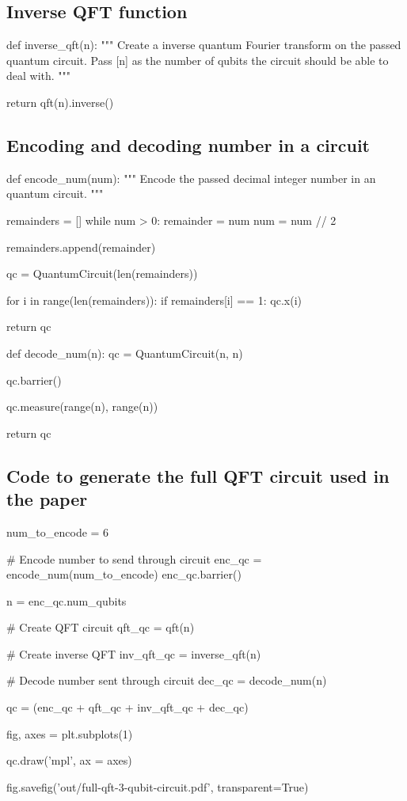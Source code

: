 \subsection{Inverse QFT function}
\label{subsec:inverse-qft-function}

\begin{python}
def inverse_qft(n):
    """
    Create a inverse quantum Fourier transform on the passed quantum circuit.
    Pass [n] as the number of qubits the circuit should be able to deal with.
    """

    return qft(n).inverse()
\end{python}

\subsection{Encoding and decoding number in a circuit}
\label{subsec:encoding-decoding-number-in-circuit}

\begin{python}
def encode_num(num):
    """
    Encode the passed decimal integer number in an quantum circuit.
    """

    remainders = []
    while num > 0:
        remainder = num %
        num = num // 2

        remainders.append(remainder)

    qc = QuantumCircuit(len(remainders))

    for i in range(len(remainders)):
        if remainders[i] == 1:
            qc.x(i)

    return qc


def decode_num(n):
    qc = QuantumCircuit(n, n)

    qc.barrier()

    qc.measure(range(n), range(n))

    return qc
\end{python}

\subsection{Code to generate the full QFT circuit used in the paper}
\label{subsec:generating-full-qft-circuit}

\begin{python}
num_to_encode = 6

# Encode number to send through circuit
enc_qc = encode_num(num_to_encode)
enc_qc.barrier()

n = enc_qc.num_qubits

# Create QFT circuit
qft_qc = qft(n)

# Create inverse QFT
inv_qft_qc = inverse_qft(n)

# Decode number sent through circuit
dec_qc = decode_num(n)


qc = (enc_qc + qft_qc + inv_qft_qc + dec_qc)

fig, axes = plt.subplots(1)

qc.draw('mpl', ax = axes)

fig.savefig('out/full-qft-3-qubit-circuit.pdf', transparent=True)
\end{python}
